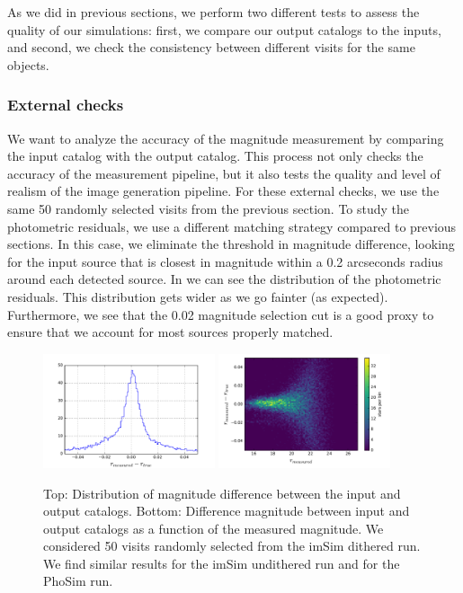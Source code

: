 \documentclass[twocolumn]{aastex62}
\begin{document}
As we did in previous sections, we perform two different tests to assess the quality of our simulations: first, we compare our output catalogs to the inputs, and second, we check the consistency between different visits for the same objects.

\subsubsection{External checks}
\label{sec:external_photometry}

We want to analyze the accuracy of the magnitude measurement by comparing the input catalog with the output catalog. This process not only checks
the accuracy of the measurement pipeline, but it also tests the quality and level of realism of the image generation pipeline.
For these external checks, we use the same 50 randomly selected visits from the previous section.
To study the photometric residuals, we use a different matching strategy compared to previous sections. In this case, we eliminate the threshold
in magnitude difference, looking for the input source that is closest in magnitude within a 0.2 arcseconds radius around each detected
source. In  we can see the distribution of the photometric residuals. This distribution gets wider as we go
fainter (as expected). Furthermore, we see that the 0.02 magnitude selection cut is a good proxy to ensure that we account for most sources properly matched.

\begin{figure}
  \centering
  \includegraphics[width=0.45\textwidth]{photometry_imsim_dithered_50visits_hist}
  \includegraphics[width=0.45\textwidth]{photometry_imsim_dithered_50visits}
  \caption{Top: Distribution of magnitude difference between the input and output catalogs.
  Bottom: Difference magnitude between input and output catalogs as a function of the measured magnitude. We considered 50 visits
  randomly selected from the imSim dithered run. We find similar results for the imSim undithered run and for the PhoSim run.}
  \label{fig:photometry_a}
\end{figure}
\end{document}
